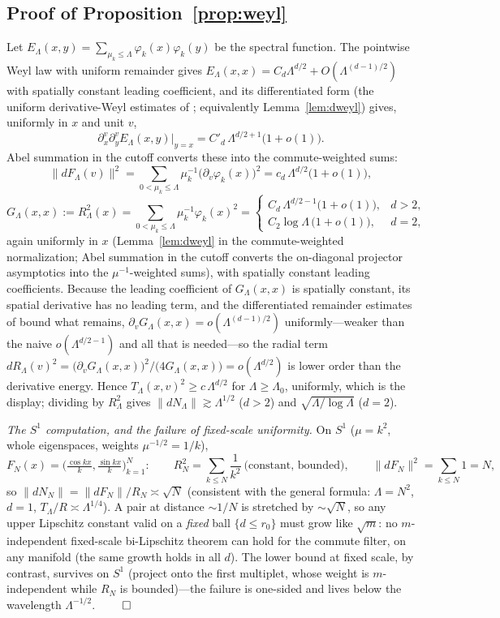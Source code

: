 \documentclass[review,supplement]{siamart220329}
\begin{document}
\subsection*{Proof of Proposition~\ref{prop:weyl}}
Let $E_\Lambda(x,y)=\sum_{\mu_k\le\Lambda}\varphi_k(x)\varphi_k(y)$ be the
spectral function. The pointwise Weyl law with uniform remainder
\cite{hormander1968} gives $E_\Lambda(x,x)=C_d\Lambda^{d/2}+O(\Lambda^{(d-1)/2})$
with spatially constant leading coefficient, and its differentiated form
(the uniform derivative-Weyl estimates of \cite{binxu2004}; equivalently
Lemma~\ref{lem:dweyl}) gives, uniformly in $x$ and unit $v$,
\[
\partial^v_x\partial^v_y E_\Lambda(x,y)\big|_{y=x}
=C'_d\,\Lambda^{d/2+1}\big(1+o(1)\big).
\]
Abel summation in the cutoff converts these into the commute-weighted sums:
\[
\lVert dF_\Lambda(v)\rVert^2
=\sum_{0<\mu_k\le\Lambda}\mu_k^{-1}\big(\partial_v\varphi_k(x)\big)^2
=c_d\,\Lambda^{d/2}\big(1+o(1)\big),
\]
\[
G_\Lambda(x,x):=R_\Lambda^2(x)
=\sum_{0<\mu_k\le\Lambda}\mu_k^{-1}\varphi_k(x)^2
=\begin{cases}
C_d\,\Lambda^{d/2-1}\big(1+o(1)\big), & d>2,\\[2pt]
C_2\log\Lambda\,\big(1+o(1)\big), & d=2,
\end{cases}
\]
again uniformly in $x$ (Lemma~\ref{lem:dweyl} in the commute-weighted
normalization; Abel summation in the cutoff converts the on-diagonal projector
asymptotics into the $\mu^{-1}$-weighted sums), with spatially constant leading
coefficients. Because the leading coefficient of $G_\Lambda(x,x)$ is spatially
constant, its spatial derivative has no leading term, and the differentiated
remainder estimates of \cite{binxu2004} bound what remains,
$\partial_vG_\Lambda(x,x)=o(\Lambda^{(d-1)/2})$ uniformly---weaker than the naive
$o(\Lambda^{d/2-1})$ and all that is needed---so the radial term
$dR_\Lambda(v)^2=\big(\partial_vG_\Lambda(x,x)\big)^2/\big(4G_\Lambda(x,x)\big)
=o(\Lambda^{d/2})$ is lower order than the derivative energy. Hence
$T_\Lambda(x,v)^2\ge c\,\Lambda^{d/2}$ for $\Lambda\ge\Lambda_0$, uniformly,
which is the display; dividing by $R_\Lambda^2$ gives
$\lVert dN_\Lambda\rVert\gtrsim\Lambda^{1/2}$ ($d>2$) and
$\sqrt{\Lambda/\log\Lambda}$ ($d=2$).

\emph{The $S^1$ computation, and the failure of fixed-scale uniformity.} On
$S^1$ ($\mu=k^2$, whole eigenspaces, weights $\mu^{-1/2}=1/k$),
\[
F_N(x)=\Big(\tfrac{\cos kx}{k},\tfrac{\sin kx}{k}\Big)_{k=1}^{N}:\qquad
R_N^2=\sum_{k\le N}\frac1{k^2}\ \text{(constant, bounded)},\qquad
\lVert dF_N\rVert^2=\sum_{k\le N}1=N,
\]
so $\lVert dN_N\rVert=\lVert dF_N\rVert/R_N\asymp\sqrt N$ (consistent with the
general formula: $\Lambda=N^2$, $d=1$, $T_\Lambda/R\asymp\Lambda^{1/4}$). A
pair at distance $\sim1/N$ is stretched by $\sim\sqrt N$, so any upper
Lipschitz constant valid on a \emph{fixed} ball $\{d\le r_0\}$ must grow like
$\sqrt m$: no $m$-independent fixed-scale bi-Lipschitz theorem can hold for
the commute filter, on any manifold (the same growth holds in all $d$). The
lower bound at fixed scale, by contrast, survives on $S^1$ (project onto the
first multiplet, whose weight is $m$-independent while $R_N$ is bounded)---the
failure is one-sided and lives below the wavelength $\Lambda^{-1/2}$.
\hfill$\qed$
\end{document}
